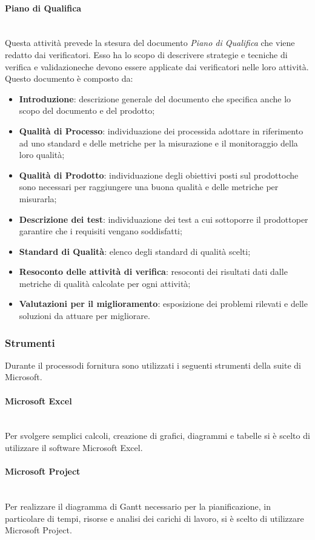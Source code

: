 \paragraph{Piano di Qualifica}\mbox{}\\ [1mm]
Questa attività prevede la stesura del documento \textit{Piano di Qualifica} che viene redatto dai verificatori. Esso ha lo scopo di descrivere strategie e tecniche di verifica e validazione\glosp che devono essere applicate dai verificatori nelle loro attività.
Questo documento è composto da:
\begin{itemize}
	\item \textbf{Introduzione}: descrizione generale del documento che specifica anche lo scopo del documento e del prodotto\glo;
	\item \textbf{Qualità di Processo}\glo: individuazione dei processi\glosp da adottare in riferimento ad uno standard e delle metriche per la misurazione e il monitoraggio della loro qualità;
	\item \textbf{Qualità di Prodotto}\glo: individuazione degli obiettivi posti sul prodotto\glosp che sono necessari per raggiungere una buona qualità e delle metriche per misurarla;
	\item \textbf{Descrizione dei test}: individuazione dei test a cui sottoporre il prodotto\glosp per garantire che i requisiti vengano soddisfatti;
	\item \textbf{Standard di Qualità}: elenco degli standard di qualità scelti;
	\item \textbf{Resoconto delle attività di verifica}: resoconti dei risultati dati dalle metriche di qualità calcolate per ogni attività;
	\item \textbf{Valutazioni per il miglioramento}: esposizione dei problemi rilevati e delle soluzioni da attuare per migliorare.
\end{itemize}
\subsubsection{Strumenti}
Durante il processo\glosp di fornitura sono utilizzati i seguenti strumenti della suite di Microsoft.
\paragraph{Microsoft Excel}\mbox{}\\ [1mm]
Per svolgere semplici calcoli, creazione di grafici, diagrammi e tabelle si è scelto di utilizzare il software Microsoft Excel.
\paragraph{Microsoft Project}\mbox{}\\ [1mm]
Per realizzare il diagramma di Gantt necessario per la pianificazione, in particolare di tempi, risorse e analisi dei carichi di lavoro, si è scelto di utilizzare Microsoft Project.

